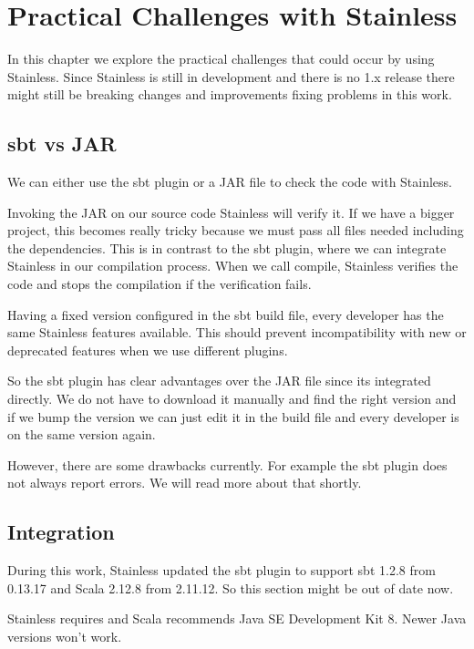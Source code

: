 \chapter{Practical Challenges with Stainless}
\label{chap:appendix_arb}

In this chapter we explore the practical challenges that could occur by using Stainless.
Since Stainless is still in development and there is no 1.x release there might still be breaking changes and improvements fixing problems in this work.


\section{sbt vs JAR}

We can either use the sbt plugin or a JAR file to check the code with Stainless.

Invoking the JAR on our source code Stainless will verify it.
If we have a bigger project, this becomes really tricky because we must pass all files needed including the dependencies.
This is in contrast to the sbt plugin, where we can integrate Stainless in our compilation process.
When we call compile, Stainless verifies the code and stops the compilation if the verification fails.

Having a fixed version configured in the sbt build file, every developer has the same Stainless features available.
This should prevent incompatibility with new or deprecated features when we use different plugins.

So the sbt plugin has clear advantages over the JAR file since its integrated directly.
We do not have to download it manually and find the right version and if we bump the version we can just edit it in the build file and every developer is on the same version again.

However, there are some drawbacks currently.
For example the sbt plugin does not always report errors.
We will read more about that shortly.


\section{Integration}

During this work, Stainless updated the sbt plugin to support sbt 1.2.8 from 0.13.17 and Scala 2.12.8 from 2.11.12.
So this section might be out of date now.

Stainless requires and Scala recommends Java SE Development Kit 8.
Newer Java versions won't work.

